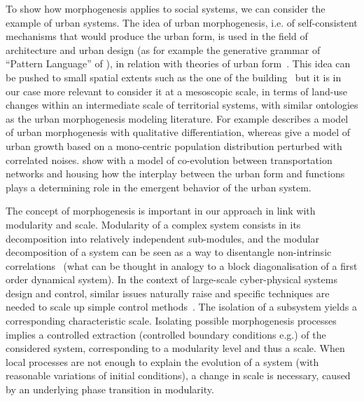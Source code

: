 \documentclass[letterpaper]{article}
\begin{document}
To show how morphogenesis applies to social systems, we can consider the example of urban systems. The idea of urban morphogenesis, i.e. of self-consistent mechanisms that would produce the urban form, is used in the field of architecture and urban design (as for example the generative grammar of ``Pattern Language'' of \cite{alexander1977pattern}), in relation with theories of urban form~\citep{moudon1997urban}. This idea can be pushed to small spatial extents such as the one of the building~\citep{whitehand1999urban} but it is in our case more relevant to consider it at a mesoscopic scale, in terms of land-use changes within an intermediate scale of territorial systems, with similar ontologies as the urban morphogenesis modeling literature. For example \cite{bonin2012modele} describes a model of urban morphogenesis with qualitative differentiation, whereas \cite{makse1998modeling} give a model of urban growth based on a mono-centric population distribution perturbed with correlated noises. \cite{raimbault2014hybrid} show with a model of co-evolution between transportation networks and housing how the interplay between the urban form and functions plays a determining role in the emergent behavior of the urban system.

The concept of morphogenesis is important in our approach in link with modularity and scale. Modularity of a complex system consists in its decomposition into relatively independent sub-modules, and the modular decomposition of a system can be seen as a way to disentangle non-intrinsic correlations~\citep{2015arXiv150904386K} (what can be thought in analogy to a block diagonalisation of a first order dynamical system). In the context of large-scale cyber-physical systems design and control, similar issues naturally raise and specific techniques are needed to scale up simple control methods~\citep{2017arXiv170105880W}. The isolation of a subsystem yields a corresponding characteristic scale. Isolating possible morphogenesis processes implies a controlled extraction (controlled boundary conditions e.g.) of the considered system, corresponding to a modularity level and thus a scale. When local processes are not enough to explain the evolution of a system (with reasonable variations of initial conditions), a change in scale is necessary, caused by an underlying phase transition in modularity.
\end{document}
